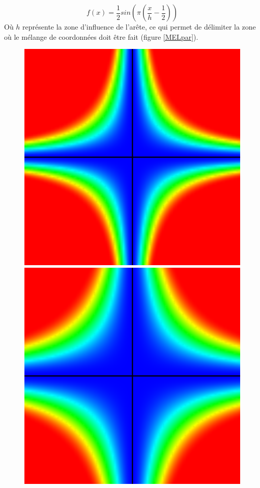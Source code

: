 \begin{equation}
  f(x) = \frac{1}{2} sin(\pi(\frac{x}{h}-\frac{1}{2}))
  \label{MELlis}
\end{equation}
Où $h$ représente la zone d'influence de l'arête, ce qui permet de
délimiter la zone où le mélange de coordonnées doit être fait (figure
\ref{MELpar}).

\begin{figure}[h]
  \begin{center}
    \includegraphics[scale=0.35]{starCage-0-2}
    \includegraphics[scale=0.35]{starCage-0-4}

\end{center}
\end{figure}
